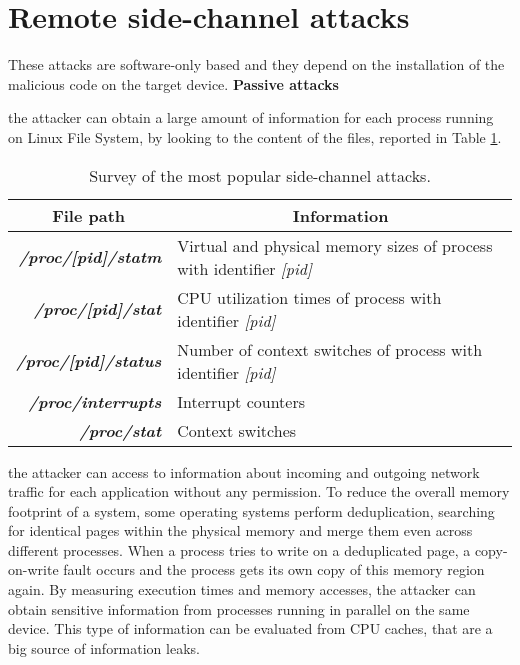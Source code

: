 \section{Remote side-channel attacks}
These attacks are software-only based and they depend on the installation of the malicious code on the target device. 
\textbf{Passive attacks}
\begin{itemize}
{the attacker can obtain a large amount of information for each process running on Linux File System, by looking to the content of the files, reported in Table \ref{sc:proc}.
\begin{table}[h]
\centering \footnotesize
\renewcommand*\arraystretch{1.3}
\begin{tabular}{rl}
\toprule
\multicolumn{1}{c}{\textbf{File path}} & \multicolumn{1}{c}{\textbf{Information}}\\
\midrule
{\textbf{\textit{/proc/[pid]/statm}}} & {Virtual and physical memory sizes of process with identifier \textit{[pid]}}\\
{\textbf{\textit{/proc/[pid]/stat}}} & {CPU utilization times of process with identifier \textit{[pid]}}\\
{\textbf{\textit{/proc/[pid]/status}}} & {Number of context switches of process with identifier \textit{[pid]}}\\
{\textbf{\textit{/proc/interrupts}}} & {Interrupt counters}\\
{\textbf{\textit{/proc/stat}}} & {Context switches}\\
\bottomrule
\end{tabular}
\caption{\footnotesize{Survey of the most popular side-channel attacks\cite{side_classification}.}}
\label{sc:proc}
\end{table}
}
{the attacker can access to information about incoming and outgoing network traffic for each application without any permission.}
{To reduce the overall memory footprint of a system, some operating systems perform deduplication, searching for identical pages within the physical memory and merge them even across different processes. When a process tries to write on a deduplicated page, a copy-on-write fault occurs and the process gets its own copy of this memory region again.}
{By measuring execution times and memory accesses, the attacker can obtain sensitive information from processes running in parallel on the same device. This type of information can be evaluated from CPU caches, that are a big source of information leaks.}

\end{itemize}
